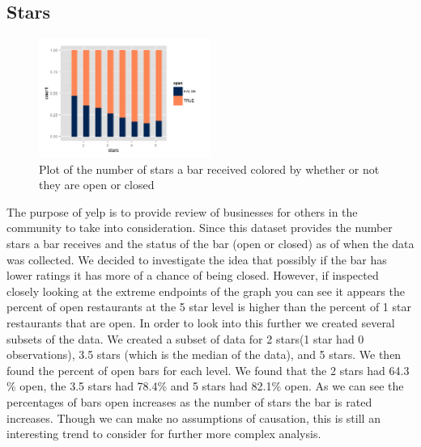 \documentclass[11pt]{article}
\begin{document}
\subsection{Stars}
\begin{figure}[h!]
  \caption{Plot of the number of stars a bar received colored by whether or not they are open or closed}
  \centering
  \label{open}
    \includegraphics[width=0.5\textwidth]{Figures/barstatus.png}
\end{figure}
The purpose of yelp is to provide review of businesses for others in the community to take into consideration.  Since this dataset provides the number stars a bar receives and the status of the bar (open or closed) as of when the data was collected.  We decided to investigate the idea that possibly if the bar has lower ratings it has more of a chance of being closed.  However, if inspected closely looking at the extreme endpoints of the graph you can see it appears the percent of open restaurants at the 5 star level is higher than the percent of 1 star restaurants that are open. In order to look into this further we created several subsets of the data.  We created a subset of data for 2 stars(1 star had 0 observations), 3.5 stars (which is the median of the data), and 5 stars.  We then found the percent of open bars for each level.  We found that the 2 stars had 64.3$\%$ open, the 3.5 stars had 78.4$\%$ and 5 stars had 82.1$\%$ open.  As we can see the percentages of bars open increases as the number of stars the bar is rated increases.  Though we can make no assumptions of causation, this is still an interesting trend to consider for further more complex analysis.
\end{document}
